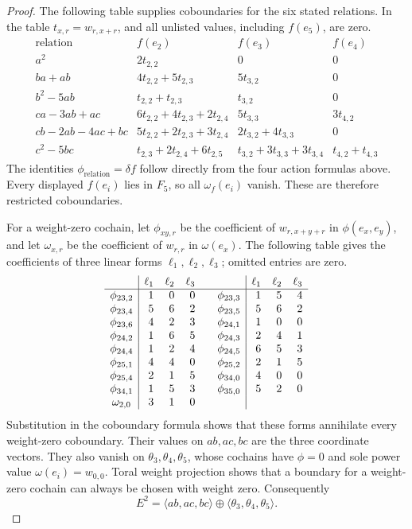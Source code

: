\documentclass[11pt,reqno]{amsart}
\theoremstyle{definition}
\theoremstyle{remark}
\theoremstyle{definition}
\begin{document}
\begin{proof}
The following table supplies coboundaries for the six stated
relations. In the table $t_{x,r}=w_{r,x+r}$, and all unlisted values,
including $f(e_5)$, are zero.
\[
\begin{array}{c|lll}
 \text{relation}&f(e_2)&f(e_3)&f(e_4)\\ \hline
 a^2&2t_{2,2}&0&0\\
 ba+ab&4t_{2,2}+5t_{2,3}&5t_{3,2}&0\\
 b^2-5ab&t_{2,2}+t_{2,3}&t_{3,2}&0\\
 ca-3ab+ac&6t_{2,2}+4t_{2,3}+2t_{2,4}&5t_{3,3}&3t_{4,2}\\
 cb-2ab-4ac+bc&5t_{2,2}+2t_{2,3}+3t_{2,4}
   &2t_{3,2}+4t_{3,3}&0\\
 c^2-5bc&t_{2,3}+2t_{2,4}+6t_{2,5}
   &t_{3,2}+3t_{3,3}+3t_{3,4}&t_{4,2}+t_{4,3}
\end{array}
\]
The identities $\phi_{\mathrm{relation}}=\delta f$ follow directly
from the four action formulas above. Every displayed $f(e_i)$ lies
in $F_5$, so all $\omega_f(e_i)$ vanish. These are therefore
restricted coboundaries.

For a weight-zero cochain, let $\phi_{xy,r}$ be the coefficient
of $w_{r,x+y+r}$ in $\phi(e_x,e_y)$, and let $\omega_{x,r}$ be
the coefficient of $w_{r,r}$ in $\omega(e_x)$.
The following table gives the coefficients of three linear forms
$\ell_1,\ell_2,\ell_3$; omitted entries are zero.
\[
\begin{array}{c|rrr@{\qquad}c|rrr}
 &\ell_1&\ell_2&\ell_3&&\ell_1&\ell_2&\ell_3\\ \hline
\phi_{23,2}&1&0&0&\phi_{23,3}&1&5&4\\
\phi_{23,4}&5&6&2&\phi_{23,5}&5&6&2\\
\phi_{23,6}&4&2&3&\phi_{24,1}&1&0&0\\
\phi_{24,2}&1&6&5&\phi_{24,3}&2&4&1\\
\phi_{24,4}&1&2&4&\phi_{24,5}&6&5&3\\
\phi_{25,1}&4&4&0&\phi_{25,2}&2&1&5\\
\phi_{25,4}&2&1&5&\phi_{34,0}&4&0&0\\
\phi_{34,1}&1&5&3&\phi_{35,0}&5&2&0\\
\omega_{2,0}&3&1&0&&&&\\
\end{array}
\]
Substitution in the coboundary formula shows that these forms
annihilate every weight-zero coboundary. Their values on $ab,ac,bc$
are the three coordinate vectors. They also vanish on
$\theta_3,\theta_4,\theta_5$, whose cochains have
$\phi=0$ and sole power value $\omega(e_i)=w_{0,0}$.
Toral weight projection shows that a boundary for a weight-zero
cochain can always be chosen with weight zero.
Consequently
\[
 E^2=\langle ab,ac,bc\rangle\oplus
 \langle\theta_3,\theta_4,\theta_5\rangle.
\]


\end{proof}
\end{document}
